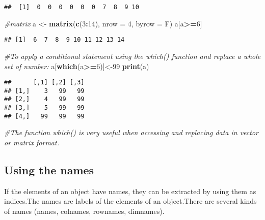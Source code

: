 \documentclass[]{book}
\newenvironment{Shaded}{\begin{snugshade}}{\end{snugshade}}
\newcommand{\KeywordTok}[1]{\textcolor[rgb]{0.13,0.29,0.53}{\textbf{#1}}}
\newcommand{\DataTypeTok}[1]{\textcolor[rgb]{0.13,0.29,0.53}{#1}}
\newcommand{\DecValTok}[1]{\textcolor[rgb]{0.00,0.00,0.81}{#1}}
\newcommand{\StringTok}[1]{\textcolor[rgb]{0.31,0.60,0.02}{#1}}
\newcommand{\CommentTok}[1]{\textcolor[rgb]{0.56,0.35,0.01}{\textit{#1}}}
\newcommand{\OperatorTok}[1]{\textcolor[rgb]{0.81,0.36,0.00}{\textbf{#1}}}
\newcommand{\NormalTok}[1]{#1}
\theoremstyle{definition}
\theoremstyle{definition}
\theoremstyle{definition}
\theoremstyle{remark}
\begin{document}
\begin{verbatim}
##  [1]  0  0  0  0  0  0  7  8  9 10
\end{verbatim}

\begin{Shaded}
\begin{Highlighting}[]
\CommentTok{#matrix}
\NormalTok{a <-}\StringTok{ }\KeywordTok{matrix}\NormalTok{(}\KeywordTok{c}\NormalTok{(}\DecValTok{3}\OperatorTok{:}\DecValTok{14}\NormalTok{), }\DataTypeTok{nrow =} \DecValTok{4}\NormalTok{, }\DataTypeTok{byrow =}\NormalTok{ F)}
\NormalTok{a[a}\OperatorTok{>=}\DecValTok{6}\NormalTok{]}
\end{Highlighting}
\end{Shaded}

\begin{verbatim}
## [1]  6  7  8  9 10 11 12 13 14
\end{verbatim}

\begin{Shaded}
\begin{Highlighting}[]
\CommentTok{#To apply a conditional statement using the which() function and replace a whole set of number:}
\NormalTok{a[}\KeywordTok{which}\NormalTok{(a}\OperatorTok{>=}\DecValTok{6}\NormalTok{)]<-}\DecValTok{99}
\KeywordTok{print}\NormalTok{(a)}
\end{Highlighting}
\end{Shaded}

\begin{verbatim}
##      [,1] [,2] [,3]
## [1,]    3   99   99
## [2,]    4   99   99
## [3,]    5   99   99
## [4,]   99   99   99
\end{verbatim}

\begin{Shaded}
\begin{Highlighting}[]
\CommentTok{#The function which() is very useful when accessing and replacing data in vector or matrix format.}
\end{Highlighting}
\end{Shaded}

\subsection{Using the names}\label{using-the-names}

If the elements of an object have names, they can be extracted by using
them as indices.The names are labels of the elements of an object.There
are several kinds of names (names, colnames, rownames, dimnames).
\end{document}
